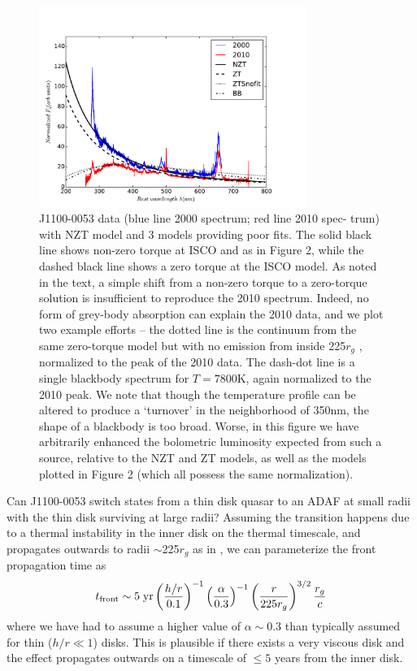 \documentclass[a4paper,fleqn,usenatbib]{mnras}
\begin{document}
\begin{figure}
  \centering
  \includegraphics[width=8.7cm, trim=0.2cm 0.2cm 1.4cm 0.6cm, clip]
  {mcd_gap_v3_3_rv1.pdf}
  \vspace{-12pt}
  \caption[]{
    J1100-0053 data (blue line 2000 spectrum; red line 2010 spec-
    trum) with NZT model and 3 models providing poor fits. The solid black
    line shows non-zero torque at ISCO 
    \citep[following][]{Afshordi_Paczynski2003} and as in Figure 2, while the dashed black line shows a zero torque
    at the ISCO model. As noted in the text, a simple shift from a non-zero
    torque to a zero-torque solution is insufficient to reproduce the 2010
    spectrum. Indeed, no form of grey-body absorption can explain the 2010
    data, and we plot two example efforts -- the dotted line is the
    continuum from the same zero-torque model but with no emission from
    inside 225$r_{g}$ , normalized to the peak of the 2010 data. The dash-dot
    line is a single blackbody spectrum for $T=7800$K, again normalized to
    the 2010 peak. We note that though the temperature profile can be
    altered to produce a `turnover' in the neighborhood of 350nm, the
    shape of a blackbody is too broad. Worse, in this figure we have
    arbitrarily enhanced the bolometric luminosity expected from such a
    source, relative to the NZT and ZT models, as well as the models
    plotted in Figure 2 (which all possess the same normalization).
}
  \label{fig:disk_suppression}
\end{figure}
Can J1100-0053 switch states from a thin disk quasar to an ADAF at
small radii with the thin disk surviving at large radii?  Assuming the
transition happens due to a thermal instability in the inner disk on
the thermal timescale, and propagates outwards to radii
$\sim$225$r_{g}$ as in \citet{Nemmen2006}, we can parameterize the
front propagation time as
\begin{equation}
    t_{\rm front}  \sim  5 \; {\rm yr} \left(\frac{h/r}{0.1}\right)^{-1}
                                                           \left(\frac{\alpha}{0.3}\right)^{-1}  
                                                           \left(\frac{r}{225r_{g}}\right)^{3/2}  
                                                           \frac{r_{g}}{c}
\label{eqn:t_front}
\end{equation}
where we have had to assume a higher value of $\alpha \sim 0.3$
\citep{King2007} than typically assumed for thin ($h/r \ll 1$)
disks. This is plausible if there exists a very viscous disk and the
effect propagates outwards on a timescale of $\leq 5$ years from the
inner disk.
\end{document}
